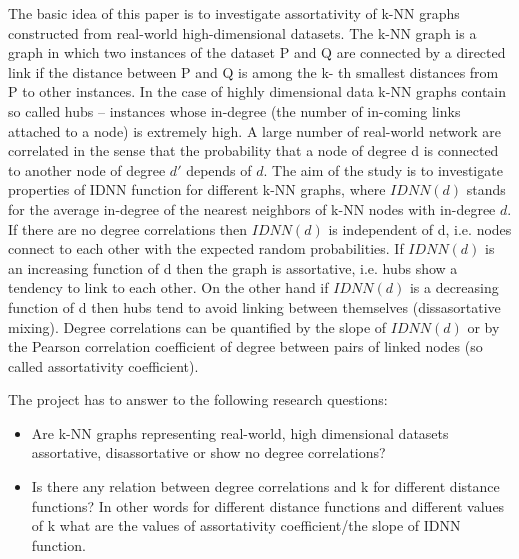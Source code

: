 The basic idea of this paper is to investigate assortativity of k-NN graphs constructed from real-world high-dimensional datasets.
The k-NN graph is a graph in which two instances of the dataset P and Q are connected by a directed link if the distance between P and Q is among the k- th smallest distances from P to other instances.
In the case of highly dimensional data k-NN graphs contain so called hubs – instances whose in-degree (the number of in-coming links attached to a node) is extremely high.
A large number of real-world network are correlated in the sense that the probability that a node of degree d is connected to another node of degree $d'$ depends of $d$.
The aim of the study is to investigate properties of IDNN function for different k-NN graphs, where $IDNN(d)$ stands for the average in-degree of the nearest neighbors of k-NN nodes with in-degree $d$.
If there are no degree correlations then $IDNN(d)$ is independent of d, i.e. nodes connect to each other with the expected random probabilities.
If $IDNN(d)$ is an increasing function of d then the graph is assortative, i.e. hubs show a tendency to link to each other.
On the other hand if $IDNN(d)$ is a decreasing function of d then hubs tend to avoid linking between themselves (dissasortative mixing).
Degree correlations can be quantified by the slope of $IDNN(d)$ or by the Pearson correlation coefficient of degree between pairs of linked nodes (so called assortativity coefficient).

The project has to answer to the following research questions:
\begin{itemize}
\item Are k-NN graphs representing real-world, high dimensional datasets assortative, disassortative or show no degree correlations?
\item Is there any relation between degree correlations and k for different distance functions? In other words for different distance functions and different values of k what are the values of assortativity coefficient/the slope of IDNN function.
\end{itemize}
